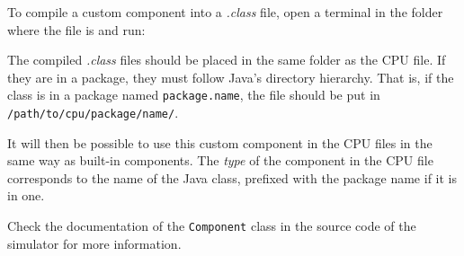 \documentclass[11pt,a4paper,twoside,titlepage]{report}
\begin{document}
To compile a custom component into a \emph{.class} file, open a terminal in
the folder where the file is and run:



The compiled \emph{.class} files should be placed in the same folder as the
CPU file. If they are in a package, they must follow Java's directory hierarchy.
That is, if the class is in a package named \verb+package.name+, the file
should be put in \verb+/path/to/cpu/package/name/+.

It will then be possible to use this custom component in the CPU files in
the same way as built-in components.
The \emph{type} of the component in the CPU file corresponds to the name of the
Java class, prefixed with the package name if it is in one.

Check the documentation of the \verb+Component+ class in the source code
of the simulator for more information.
\end{document}
